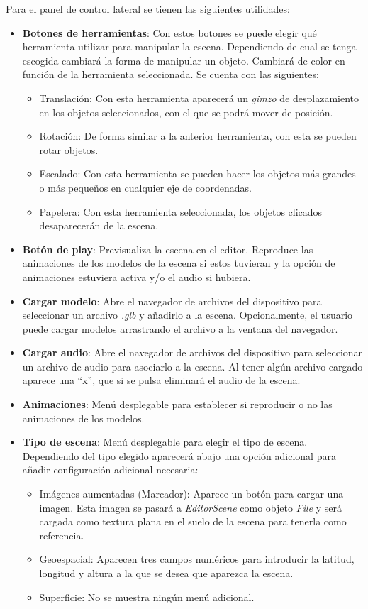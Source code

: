 Para el panel de control lateral se tienen las siguientes utilidades:

\begin{itemize}
    \item \textbf{Botones de herramientas}: Con estos botones se puede elegir qué herramienta utilizar para manipular la escena. Dependiendo de cual se tenga escogida cambiará la forma de manipular un objeto. Cambiará de color en función de la herramienta seleccionada. Se cuenta con las siguientes:
        \begin{itemize}
            \item Translación: Con esta herramienta aparecerá un \textit{gimzo} de desplazamiento en los objetos seleccionados, con el que se podrá mover de posición.
            \item Rotación: De forma similar a la anterior herramienta, con esta se pueden rotar objetos.
            \item Escalado: Con esta herramienta se pueden hacer los objetos más grandes o más pequeños en cualquier eje de coordenadas.
            \item Papelera: Con esta herramienta seleccionada, los objetos clicados desaparecerán de la escena.
        \end{itemize}

    \item \textbf{Botón de play}: Previsualiza la escena en el editor. Reproduce las animaciones de los modelos de la escena si estos tuvieran y la opción de animaciones estuviera activa y/o el audio si hubiera.
    \item \textbf{Cargar modelo}: Abre el navegador de archivos del dispositivo para seleccionar un archivo \textit{.glb} y añadirlo a la escena. Opcionalmente, el usuario puede cargar modelos arrastrando el archivo a la ventana del navegador.
    \item \textbf{Cargar audio}: Abre el navegador de archivos del dispositivo para seleccionar un archivo de audio para asociarlo a la escena. Al tener algún archivo cargado aparece una ``x'', que si se pulsa eliminará el audio de la escena.
    \item \textbf{Animaciones}: Menú desplegable para establecer si reproducir o no las animaciones de los modelos.
    \item \textbf{Tipo de escena}: Menú desplegable para elegir el tipo de escena. Dependiendo del tipo elegido aparecerá abajo una opción adicional para añadir configuración adicional necesaria:
        \begin{itemize}
            \item Imágenes aumentadas (Marcador): Aparece un botón para cargar una imagen. Esta imagen se pasará a \textit{EditorScene} como objeto \textit{File} y será cargada como textura plana en el suelo de la escena para tenerla como referencia.
            \item Geoespacial: Aparecen tres campos numéricos para introducir la latitud, longitud y altura a la que se desea que aparezca la escena.
            \item Superficie: No se muestra ningún menú adicional.
        \end{itemize}
\end{itemize}

